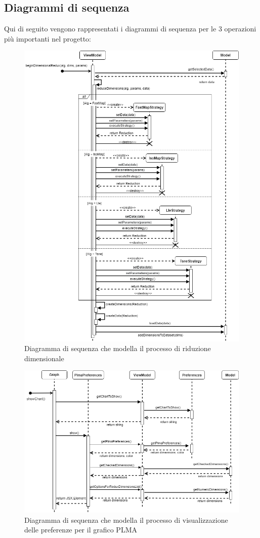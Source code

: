 \subsection{Diagrammi di sequenza}
Qui di seguito vengono rappresentati i diagrammi di sequenza per le 3 operazioni più importanti nel progetto:
\begin{figure}[hb]
\includegraphics[width=12cm]{Images/Allegato Tecnico-Sequenza-DR}
\centering
\caption{Diagramma di sequenza che modella il processo di riduzione dimensionale}
\end{figure}
\newpage
\vspace*{\fill}
\begin{figure}[hb]
\includegraphics[width=15.5cm]{Images/Allegato Tecnico-Sequenza-PLMApref}
\centering
\caption{Diagramma di sequenza che modella il processo di visualizzazione delle preferenze per il grafico PLMA}
\end{figure}
